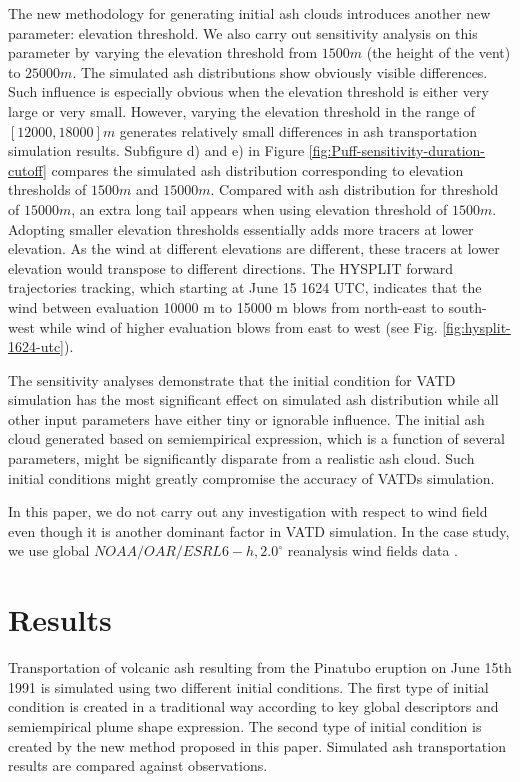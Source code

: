 \documentclass[utf8]{frontiersSCNS} %
\begin{document}
The new methodology for generating initial ash clouds introduces another new parameter: elevation threshold. We also carry out sensitivity analysis on this parameter by varying the elevation threshold from $1500 m$ (the height of the vent) to $25000 m$. The simulated ash distributions show obviously visible differences. Such influence is especially obvious when the elevation threshold is either very large or very small. However, varying the elevation threshold in the range of $[12000, 18000] m$ generates relatively small differences in ash transportation simulation results.  Subfigure d) and e) in Figure \ref{fig:Puff-sensitivity-duration-cutoff} compares the simulated ash distribution corresponding to elevation thresholds of $1500 m$ and $15000 m$. Compared with ash distribution for threshold of $15000 m$, an extra long tail appears when using elevation threshold of $1500 m$. Adopting smaller elevation thresholds essentially adds more tracers at lower elevation. As the wind at different elevations are different, these tracers at lower elevation would transpose to different directions. The HYSPLIT \citep{stein2015noaa, rolph2017real} forward trajectories tracking, which starting at June 15 1624 UTC, indicates that the wind between evaluation 10000 m to 15000 m blows from north-east to south-west while wind of higher evaluation blows from east to west (see Fig. \ref{fig:hysplit-1624-utc}).

The sensitivity analyses demonstrate that the initial condition for VATD simulation has the most significant effect on simulated ash distribution while all other input parameters have either tiny or ignorable influence. The initial ash cloud generated based on semiempirical expression, which is a function of several parameters, might be significantly disparate from a realistic ash cloud. Such initial conditions might greatly compromise the accuracy of VATDs simulation.


In this paper, we do not carry out any investigation with respect to wind field even though it is another dominant factor in VATD simulation. In the case study, we use global $NOAA/OAR/ESRL 6-h, 2.0^{\circ}$ reanalysis wind fields data \citep{whitaker2004reanalysis, compo2006feasibility, compo2011twentieth}.

\section{Results}

Transportation of volcanic ash resulting from the Pinatubo eruption on June 15th 1991 is simulated using two different initial conditions.
The first type of initial condition is created in a traditional way according to key global descriptors and semiempirical plume shape expression. The second type of initial condition is created by the new method proposed in this paper. Simulated ash transportation results are compared against observations.
\end{document}
